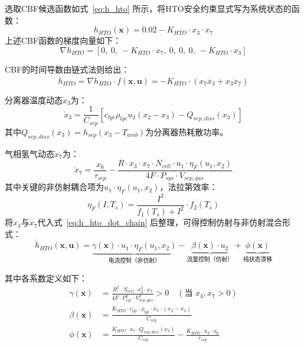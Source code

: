 选取CBF候选函数如式~\eqref{eq:h_hto} 所示，将HTO安全约束显式写为系统状态的函数：
\begin{equation}
  h_{HTO}(\mathbf{x}) = 0.02 - K_{HTO} \cdot x_3 \cdot x_7
\label{eq:h_hto}
\end{equation}
上述CBF函数的梯度向量如下：
\begin{equation}
  \nabla h_{HTO} = \left[ 0,\ 0,\ -K_{HTO} \cdot x_7,\ 0,\ 0,\ 0,\ -K_{HTO} \cdot x_3 \right]
\end{equation}

CBF的时间导数由链式法则给出：
\begin{equation}
  \dot{h}_{HTO} = \nabla h_{HTO} \cdot f(\mathbf{x}, \mathbf{u}) = -K_{HTO} \cdot \left( x_7 \dot{x}_3 + x_3 \dot{x}_7 \right)
\label{eq:h_hto_dot_chain}
\end{equation}

分离器温度动态$\dot{x}_3$为：
\begin{equation}
  \dot{x}_3 = \frac{1}{C_{sep}}\left[ c_{lye}\rho_{lye} u_2 (x_2 - x_3) - Q_{sep,diss}(x_3) \right]
\end{equation}
其中$Q_{sep,diss}(x_3) = h_{sep}(x_3 - T_{amb})$为分离器热耗散功率。

气相氢气动态$\dot{x}_7$为：
\begin{equation}
  \dot{x}_7 = \frac{x_6}{\tau_{sep}} - \frac{R \cdot x_3 \cdot x_7 \cdot N_{cell} \cdot u_1 \cdot \eta_F(u_1, x_2)}{4F \cdot P_{sys} \cdot V_{sep,gas}}
\end{equation}
其中关键的非仿射耦合项为$u_1 \cdot \eta_F(u_1, x_2)$，法拉第效率：
\begin{equation}
  \eta_F(I, T_s) = \frac{I^2}{f_1(T_s) + I^2} \cdot f_2(T_s)
\end{equation}
将$\dot{x}_3$与$\dot{x}_7$代入式~\eqref{eq:h_hto_dot_chain} 后整理，可得控制仿射与非仿射混合形式：
\begin{equation}
  \dot{h}_{HTO}(\mathbf{x}, \mathbf{u}) = \underbrace{\gamma(\mathbf{x}) \cdot u_1 \cdot \eta_F(u_1, x_2)}_{\text{电流控制（非仿射）}} - \underbrace{\beta(\mathbf{x}) \cdot u_2}_{\text{流量控制（仿射）}} + \underbrace{\phi(\mathbf{x})}_{\text{纯状态漂移}}
\label{eq:h_hto_expanded}
\end{equation}

其中各系数定义如下：
\begin{align}
  \gamma(\mathbf{x}) &= \frac{R^2 \cdot N_{cell} \cdot x_3^2 \cdot x_7}{4F \cdot P_{sys}^2 \cdot V_{sep,gas}^2} > 0 \quad (\text{当 } x_3, x_7 > 0) \\
  \beta(\mathbf{x}) &= \frac{K_{HTO} \cdot c_{lye} \cdot \rho_{lye} \cdot x_7 \cdot (x_2 - x_3)}{C_{sep}} \\
  \phi(\mathbf{x}) &= \frac{K_{HTO} \cdot x_7 \cdot Q_{sep,diss}(x_3)}{C_{sep}} - \frac{K_{HTO} \cdot x_3 \cdot x_6}{\tau_{sep}}
\end{align}

